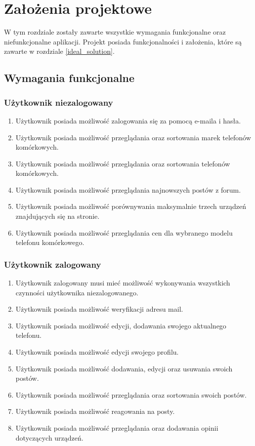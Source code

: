 \section{Założenia projektowe}
W tym rozdziale zostały zawarte wszystkie wymagania funkcjonalne oraz niefunkcjonalne aplikacji. Projekt posiada funkcjonalności i założenia, które są zawarte w rozdziale \ref*{ideal_solution}. 
\subsection{Wymagania funkcjonalne}
\subsubsection{Użytkownik niezalogowany}
\begin{enumerate}
    \item Użytkownik posiada możliwość zalogowania się za pomocą e-maila i hasła.
    \item Użytkownik posiada możliwość przeglądania oraz sortowania marek telefonów komórkowych.
    \item Użytkownik posiada możliwość przeglądania oraz sortowania telefonów komórkowych.
    \item Użytkownik posiada możliwość przeglądania najnowszych postów z forum.
    \item Użytkownik posiada możliwość porównywania maksymalnie trzech urządzeń znajdujących się na stronie.
    \item Użytkownik posiada możliwość przeglądania cen dla wybranego modelu telefonu komórkowego.
\end{enumerate}
\subsubsection{Użytkownik zalogowany}
\begin{enumerate}
    \item Użytkownik zalogowany musi mieć możliwość wykonywania wszystkich czynności użytkownika niezalogowanego.
    \item Użytkownik posiada możliwość weryfikacji adresu mail.
    \item Użytkownik posiada możliwość edycji, dodawania swojego aktualnego telefonu.
    \item Użytkownik posiada możliwość edycji swojego profilu.
    \item Użytkownik posiada możliwość dodawania, edycji oraz usuwania swoich postów.
    \item Użytkownik posiada możliwość przeglądania oraz sortowania swoich postów.
    \item Użytkownik posiada możliwość reagowania na posty.
    \item Użytkownik posiada możliwość przeglądania oraz dodawania opinii dotyczących urządzeń.
\end{enumerate}

